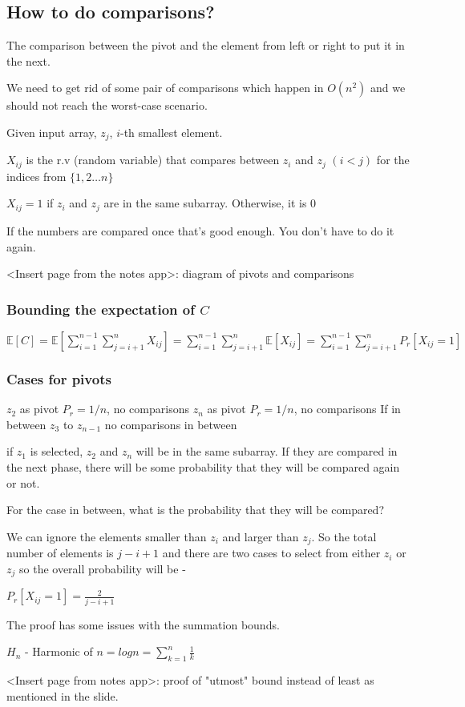 \documentclass{article}
\begin{document}
\subsection{How to do comparisons?}

The comparison between the pivot and the element from left or right to put it in the next.

We need to get rid of some pair of comparisons which happen in $O(n^2)$ and we should not reach the worst-case scenario.

Given input array, $z_j$, $i$-th smallest element.

$X_{ij}$ is the r.v (random variable) that compares between $z_i$ and $z_j$ $(i<j)$ for the indices from $\{1,2 \ldots n\}$

$X_{ij} = 1$ if $z_i$ and $z_j$ are in the same subarray. Otherwise, it is 0

If the numbers are compared once that's good enough. You don't have to do it again.

<Insert page from the notes app>: diagram of pivots and comparisons

\subsubsection{Bounding the expectation of $C$}

$\mathbb E[C] = \mathbb E[\sum^{n-1}_{i=1} \sum_{j=i+1}^{n} X_{ij}] = \sum^{n-1}_{i=1} \sum_{j=i+1}^{n} \mathbb E[X_{ij}] = \sum^{n-1}_{i=1} \sum_{j=i+1}^{n} P_r[X_{ij} = 1]$

\subsubsection{Cases for pivots}

$z_2$ as pivot $P_r = 1/n$, no comparisons
$z_n$ as pivot $P_r = 1/n$, no comparisons
If in between $z_3$ to $z_{n-1}$ no comparisons in between

if $z_1$ is selected, $z_2$ and $z_n$ will be in the same subarray. If they are compared in the next phase, there will be some probability that they will be compared again or not.

For the case in between, what is the probability that they will be compared? 

We can ignore the elements smaller than $z_i$ and larger than $z_j$. So the total number of elements is $j-i+1$ and there are two cases to select from either $z_i$ or $z_j$ so the overall probability will be - 

$P_r[X_{ij} = 1] = \frac{2}{j-i+1}$

The proof has some issues with the summation bounds.

$H_n$ - Harmonic of $n = log n = \sum^{n}_{k=1} \frac{1}{k}$

<Insert page from notes app>: proof of "utmost" bound instead of least as mentioned in the slide.



\end{document}
